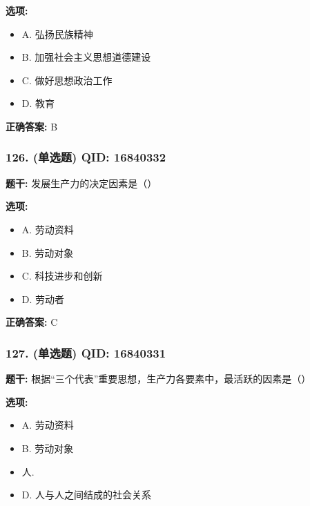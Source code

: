 \documentclass[12pt,UTF8]{ctexart}
\begin{document}
\textbf{选项:}
\begin{itemize}[leftmargin=*]

  \item A. 弘扬民族精神

  \item B. 加强社会主义思想道德建设

  \item C. 做好思想政治工作

  \item D. 教育

\end{itemize}

\textbf{正确答案:}
B

\vspace{0.3em}\hrulefill\vspace{0.7em}

\subsubsection*{126. (单选题) \small QID: 16840332}

\textbf{题干:}
发展生产力的决定因素是（）

\textbf{选项:}
\begin{itemize}[leftmargin=*]

  \item A. 劳动资料

  \item B. 劳动对象

  \item C. 科技进步和创新

  \item D. 劳动者

\end{itemize}

\textbf{正确答案:}
C

\vspace{0.3em}\hrulefill\vspace{0.7em}

\subsubsection*{127. (单选题) \small QID: 16840331}

\textbf{题干:}
根据“三个代表”重要思想，生产力各要素中，最活跃的因素是（）

\textbf{选项:}
\begin{itemize}[leftmargin=*]

  \item A. 劳动资料

  \item B. 劳动对象

  \item 人. 

  \item D. 人与人之间结成的社会关系

\end{itemize}
\end{document}
